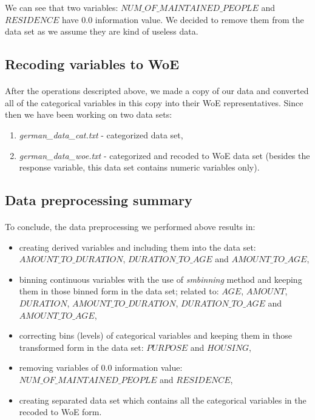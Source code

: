 \documentclass[10pt]{article}\usepackage[]{graphicx}\usepackage[]{color}
\begin{document}
We can see that two variables: $NUM\_OF\_MAINTAINED\_PEOPLE$ and $RESIDENCE$ have $0.0$ information value. We decided to remove them from the data set as we assume they are kind of useless data.


\subsection{Recoding variables to WoE}
\paragraph{}
After the operations descripted above, we made a copy of our data and converted all of the categorical variables in this copy into their WoE representatives. Since then 
we have been working on two data sets: 
\begin{enumerate}
\item \textit{german\_data\_cat.txt} - categorized data set,
\item \textit{german\_data\_woe.txt} - categorized and recoded to WoE data set (besides the response variable, this data set contains numeric variables only). 
\end{enumerate}


\subsection{Data preprocessing summary}
\paragraph{}
To conclude, the data preprocessing we performed above results in: 
  \begin{itemize}
\item creating derived variables and including them into the data set: $AMOUNT\_TO\_DURATION$, $DURATION\_TO\_AGE$ and $AMOUNT\_TO\_AGE$,
\item binning continuous variables with the use of \textit{smbinning} method and keeping them in those binned form in the data set; related to: $AGE$, $AMOUNT$, $DURATION$, $AMOUNT\_TO\_DURATION$, $DURATION\_TO\_AGE$ and $AMOUNT\_TO\_AGE$,
\item correcting bins (levels) of categorical variables and keeping them in those transformed form in the data set: $PURPOSE$ and $HOUSING$,
\item removing variables of $0.0$ information value:  $NUM\_OF\_MAINTAINED\_PEOPLE$ and $RESIDENCE$,
\item creating separated data set which contains all the categorical variables in the recoded to WoE form. 
\end{itemize}
\end{document}

